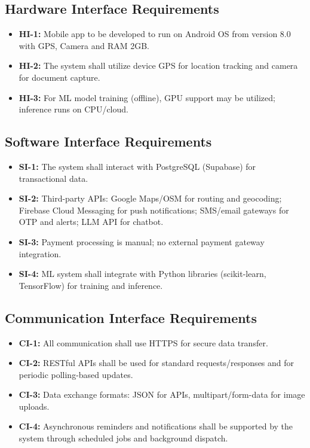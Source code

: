 \subsection{Hardware Interface Requirements}
\begin{itemize}
\item \textbf{HI-1:} Mobile app to be developed to run on Android OS from version 8.0 with GPS, Camera and RAM 2GB.
\item \textbf{HI-2:} The system shall utilize device GPS for location tracking and camera for document capture.
\item \textbf{HI-3:} For ML model training (offline), GPU support may be utilized; inference runs on CPU/cloud.
\end{itemize}

\subsection{Software Interface Requirements}
\begin{itemize}
\item \textbf{SI-1:} The system shall interact with PostgreSQL (Supabase) for transactional data.
\item \textbf{SI-2:} Third-party APIs: Google Maps/OSM for routing and geocoding; Firebase Cloud Messaging for push notifications; SMS/email gateways for OTP and alerts; LLM API for chatbot.
\item \textbf{SI-3:} Payment processing is manual; no external payment gateway integration.
\item \textbf{SI-4:} ML system shall integrate with Python libraries (scikit-learn, TensorFlow) for training and inference.
\end{itemize}

\subsection{Communication Interface Requirements}
\begin{itemize}
\item \textbf{CI-1:} All communication shall use HTTPS for secure data transfer.
\item \textbf{CI-2:} RESTful APIs shall be used for standard requests/responses and for periodic polling-based updates.
\item \textbf{CI-3:} Data exchange formats: JSON for APIs, multipart/form-data for image uploads.
\item \textbf{CI-4:} Asynchronous reminders and notifications shall be supported by the system through scheduled jobs and background dispatch.
\end{itemize}

